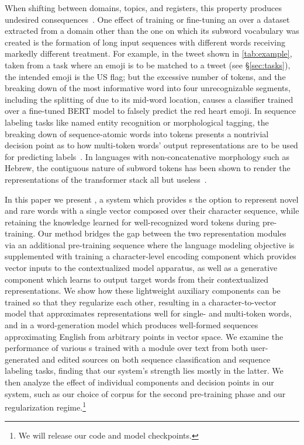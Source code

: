 When shifting between domains, topics, and registers, this property produces undesired consequences~\cite{blitzer-etal-2007-biographies}.
One effect of training or fine-tuning an \llm{} over a dataset extracted from a domain other than the one on which its subword vocabulary was created is the formation of long input sequences with different words receiving markedly different treatment.
For example, in the tweet shown in \autoref{tab:example}, taken from a task where an emoji is to be matched to a tweet (see \S\ref{sec:tasks}), the intended emoji is the US flag; %
but the excessive number of \wpc{} tokens, and the breaking down of the most informative word  into four unrecognizable segments, including the splitting of  due to its mid-word location, causes a classifier trained over a fine-tuned BERT model to falsely predict the red heart emoji. %
In sequence labeling tasks like named entity recognition or morphological tagging, the breaking down of sequence-atomic words into tokens presents a nontrivial decision point as to how multi-token words' output representations are to be used for predicting labels~\cite{acs2021subword}.
In languages with non-concatenative morphology such as Hebrew, the contiguous nature of subword tokens has been shown to render the representations of the transformer stack all but useless~\cite{klein-tsarfaty-2020-getting}.

In this paper we present \tokdetok{}, a system which provides \llm{}s the option to represent novel and rare words with a single vector composed over their character sequence, while retaining the knowledge learned for well-recognized word tokens during pre-training.
Our method bridges the gap between the two representation modules via an additional pre-training sequence where the language modeling objective is supplemented with training a character-level encoding component which provides vector inputs to the contextualized model apparatus, as well as a generative component which learns to output target words from their contextualized representations.
We show how these lightweight auxiliary components can be trained so that they regularize each other, resulting in a character-to-vector model that approximates representations well for single- and multi-token words, and in a word-generation model which produces well-formed sequences approximating English from arbitrary points in vector space.
We examine the performance of various \llm{}s trained with a \tokdetok{} module over text from both user-generated and edited sources on both sequence classification and sequence labeling tasks, finding that our system's strength lies mostly in the latter.
We then analyze the effect of individual components and decision points in our system, such as our choice of corpus for the second pre-training phase and our regularization regime.\footnote{We will release our code and model checkpoints.}


